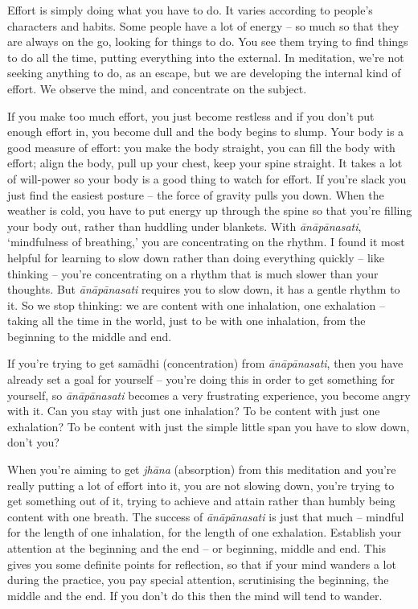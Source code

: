 
Effort is simply doing what you have to do. It varies according to people's characters and habits. Some people have a lot of energy -- so much so that they are always on the go, looking for things to do. You see them trying to find things to do all the time, putting everything into the external. In meditation, we're not seeking anything to do, as an escape, but we are developing the internal kind of effort. We observe the mind, and concentrate on the subject.

If you make too much effort, you just become restless and if you don't put enough effort in, you become dull and the body begins to slump. Your body is a good measure of effort: you make the body straight, you can fill the body with effort; align the body, pull up your chest, keep your spine straight. It takes a lot of will-power so your body is a good thing to watch for effort. If you're slack you just find the easiest posture -- the force of gravity pulls you down. When the weather is cold, you have to put energy up through the spine so that you're filling your body out, rather than huddling under blankets. With \textit{\=an\=ap\=anasati}, `mindfulness of breathing,' you are concentrating on the rhythm. I found it most helpful for learning to slow down rather than doing everything quickly -- like thinking -- you're concentrating on a rhythm that is much slower than your thoughts. But \textit{\=an\=ap\=anasati} requires you to slow down, it has a gentle rhythm to it. So we stop thinking: we are content with one inhalation, one exhalation -- taking all the time in the world, just to be with one inhalation, from the beginning to the middle and end.

If you're trying to get sam\=adhi (concentration) from \textit{\=an\=ap\=anasati}, then you have already set a goal for yourself -- you're doing this in order to get something for yourself, so \textit{\=an\=ap\=anasati} becomes a very frustrating experience, you become angry with it. Can you stay with just one inhalation? To be content with just one exhalation? To be content with just the simple little span you have to slow down, don't you?

When you're aiming to get \textit{jhāna} (absorption) from this meditation and you're really putting a lot of effort into it, you are not slowing down, you're trying to get something out of it, trying to achieve and attain rather than humbly being content with one breath. The success of \textit{\=an\=ap\=anasati} is just that much -- mindful for the length of one inhalation, for the length of one exhalation. Establish your attention at the beginning and the end -- or beginning, middle and end. This gives you some definite points for reflection, so that if your mind wanders a lot during the practice, you pay special attention, scrutinising the beginning, the middle and the end. If you don't do this then the mind will tend to wander.

